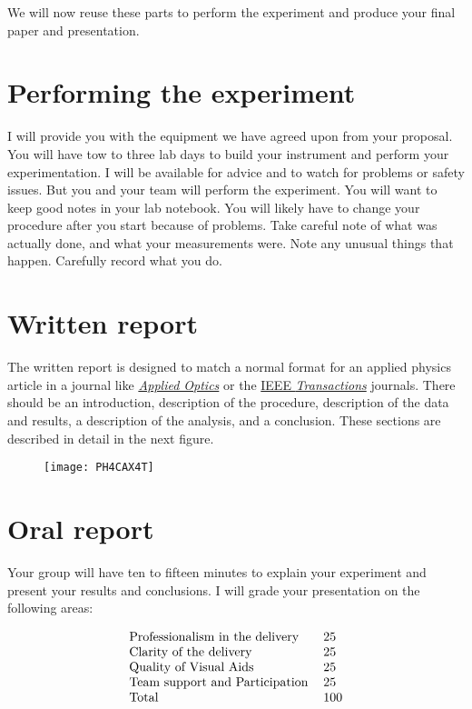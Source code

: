 \noindent We will now reuse these parts to perform the experiment and produce your final paper and presentation.

\section{Performing the experiment}

I will provide you with the equipment we have agreed upon from your proposal. You will have tow to three lab days to build your instrument and perform your experimentation. I will be available for advice and to watch for problems or safety issues. But you and your team will perform the experiment. You will want to keep good notes in your lab notebook. You will likely have to change your procedure after you start because of problems. Take careful note of what was actually done, and what your measurements were. Note any unusual things that happen. Carefully record what you do.

\section{Written report}

The written report is designed to match a normal format for an applied
physics article in a journal like \href{https://opg.optica.org/ao/home.cfm}{\emph{Applied Optics}} or the \href{https://ieeexplore.ieee.org/xpl/RecentIssue.jsp?punumber=36}{IEEE \emph {Transactions}} journals. There should be an introduction, description of the procedure, description of the data and results, a description of the analysis, and a conclusion. These sections are described in detail in the next figure.

\begin{figure}[]
\texttt{[image: PH4CAX4T]}
\end{figure}

\section{Oral report}

Your group will have ten to fifteen minutes to explain your experiment and
present your results and conclusions. I will grade your presentation on the following areas:

\begin{equation*}
\begin{tabular}{ll}
Professionalism in the delivery & 25 \\ 
Clarity of the delivery & 25 \\ 
Quality of Visual Aids & 25 \\ 
Team support and Participation & 25 \\ 
Total & 100%
\end{tabular}%
\end{equation*}

